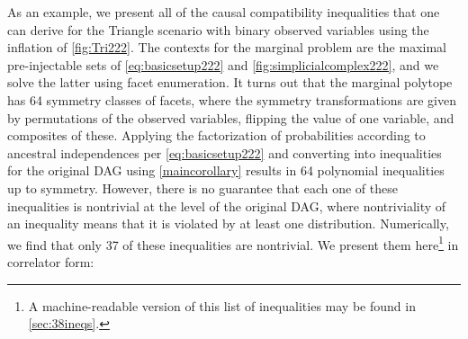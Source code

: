 {%



As an example, 
we present all of the causal compatibility inequalities that one can derive for the Triangle scenario with binary observed variables using the inflation of \cref{fig:Tri222}. The contexts for the marginal problem are the maximal pre-injectable sets of \cref{eq:basicsetup222} and \cref{fig:simplicialcomplex222}, and we solve the latter using facet enumeration. It turns out that the marginal polytope has 64 symmetry classes of facets, where the symmetry transformations are given by permutations of the observed variables, flipping the value of one variable, and composites of these.
Applying the factorization of probabilities according to ancestral independences per \cref{eq:basicsetup222} and converting into inequalities for the original DAG using \cref{maincorollary} results in 64 polynomial inequalities up to symmetry. However, there is no guarantee that each one of these inequalities is nontrivial at the level of the original DAG, where nontriviality of an inequality means that it is violated by at least one distribution. Numerically, we find that only 37 of these inequalities are nontrivial. We present them here\footnote{A machine-readable version of this list of inequalities may be found in \cref{sec:38ineqs}.} in correlator form:
}

